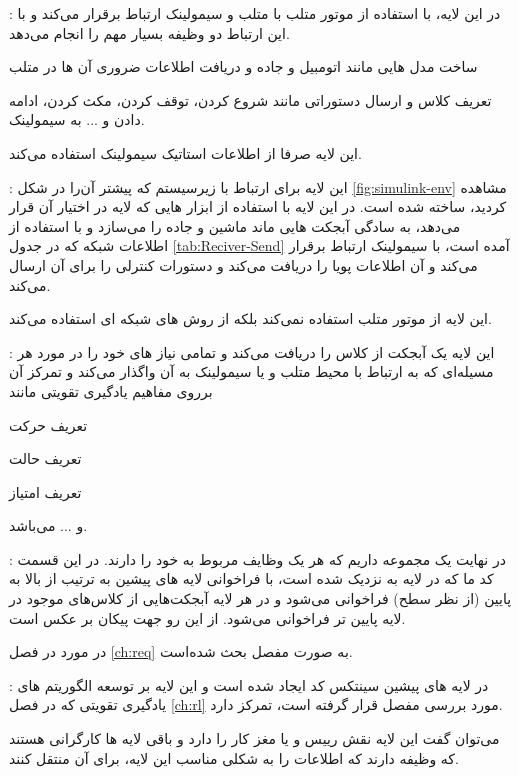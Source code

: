 \begin{circlelist}
	\item \textbf{} :
	در این لایه، با استفاده از موتور متلب با متلب و سیمولینک ارتباط برقرار می‌کند و با این ارتباط دو وظیفه بسیار مهم را انجام می‌دهد. 
	\begin{alphabetlist}
		\item 
		ساخت مدل هایی مانند اتومبیل و جاده و دریافت اطلاعات ضروری آن ها در متلب
		\item 
		تعریف کلاس  و ارسال دستوراتی مانند شروع کردن، توقف کردن، مکث کردن، ادامه دادن و ... به سیمولینک.
	\end{alphabetlist}
	این لایه صرفا از اطلاعات استاتیک سیمولینک استفاده می‌کند.
	
	\item \textbf{} :
	این لایه برای ارتباط با زیرسیستم  که پیشتر آن‌را در شکل 
	\ref{fig:simulink-env}
	مشاهده کردید، ساخته شده است. در این لایه با استفاده از ابزار هایی که لایه 
	در اختیار آن قرار می‌دهد، به سادگی آبجکت هایی ماند ماشین و جاده را می‌سازد و با استفاده از اطلاعات شبکه که در جدول 
	\ref{tab:Reciver-Send}
	آمده است، با سیمولینک ارتباط برقرار می‌کند و آن اطلاعات پویا را دریافت می‌کند و دستورات کنترلی را برای آن ارسال می‌کند.
	
	این لایه از موتور متلب استفاده نمی‌کند بلکه از روش های شبکه ای استفاده می‌کند. 
	\item \textbf{} :
	این لایه یک آبجکت از کلاس 
	را دریافت می‌کند و تمامی نیاز های خود را در مورد هر مسیله‌ای که به ارتباط با محیط متلب و یا سیمولینک به آن واگذار می‌کند و تمرکز آن برروی مفاهیم یادگیری تقویتی مانند 
	\begin{enuminline}
		\item {}
		\item {}
		\item  تعریف حرکت
		\item تعریف حالت 
		\item تعریف امتیاز
	\end{enuminline} 
	و ... می‌باشد.
	
	
	\item \textbf{} :
	در نهایت یک مجموعه داریم که هر یک وظایف مربوط به خود را دارند. در این قسمت کد ما که در لایه  به  نزدیک شده است، با فراخوانی لایه های پیشین به ترتیب از بالا به پایین (از نظر سطح) فراخوانی می‌شود و در هر لایه آبجکت‌هایی از کلاس‌های موجود در لایه پایین تر فراخوانی می‌شود. از این رو جهت پیکان بر عکس است. 
	
	در مورد  در فصل 
	\ref{ch:req}
	به صورت مفصل بحث شده‌است.
	
	\item \textbf{} :
	در لایه های پیشین سینتکس کد  ایجاد شده است و این لایه بر توسعه الگوریتم های یادگیری تقویتی که در فصل 
	\ref{ch:rl}
	مورد بررسی مفصل قرار گرفته است، تمرکز دارد.
	
	می‌توان گفت این لایه نقش رییس و یا مغز کار را دارد و باقی لایه ها کارگرانی هستند که وظیفه دارند که اطلاعات را به شکلی مناسب این لایه، برای آن منتقل کنند.
\end{circlelist}	


